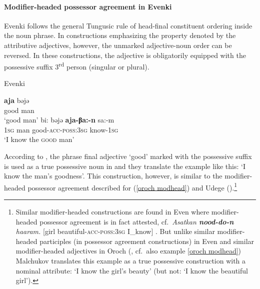 \paragraph*{Modifier\hyp{}headed possessor agreement in Evenki}
Evenki follows the general Tungusic rule of head-final constituent ordering inside the noun phrase. In constructions emphasizing the property denoted by the attributive adjectives, however, the unmarked adjective-noun order can be reversed. In these constructions, the adjective is obligatorily equipped with the possessive suffix 3\textsuperscript{rd} person (singular or plural).
\begin{exe}
\ex 
\rm{Evenki \citep[18]{bulatova-etal1999}}
\begin{xlist}
\ex	
\gll	\textbf{aja} bəjə\\
	good man\\
\glt	‘good man’
\ex
\label{evenki poss}
\gll	bi: bəjə \textbf{aja-βa:-n} sa:-m\\
	\textsc{1sg} man good-\textsc{acc}-\textsc{poss:3sg} know-\textsc{1sg}\\
\glt	‘I know the \textsc{good} man’
\end{xlist}
\end{exe}
According to \citet[18]{bulatova-etal1999}, the phrase final adjective ‘good’ marked with the possessive suffix is used as a true possessive noun in  and they translate the example like this: ‘I know the man's goodness’. This construction, however, is similar to the modifier\hyp{}headed possessor agreement described for  (\ref{oroch modhead}) and Udege (\citealt[485, passim]{nikolaeva-etal2001}).\footnote{Similar modifier\hyp{}headed constructions are found in Even where modifier\hyp{}headed possessor agreement is in fact attested, cf.~\textit{Asatkan \textbf{nood-do-n} haaram.} [girl beautiful-\textsc{acc}-\textsc{poss:3sg} I\_know] \citep[11]{malchukov1995}. But unlike similar modifier\hyp{}headed participles (in possessor agreement constructions) in Even \citep[31]{malchukov1995} and similar modifier\hyp{}headed adjectives in Oroch (\citealt{malchukov2000}, cf.~also example \ref{oroch modhead}) Malchukov translates this example as a true possessive construction with a nominal attribute: ‘I know the girl's beauty’ (but not: ‘I know the beautiful girl’).}

